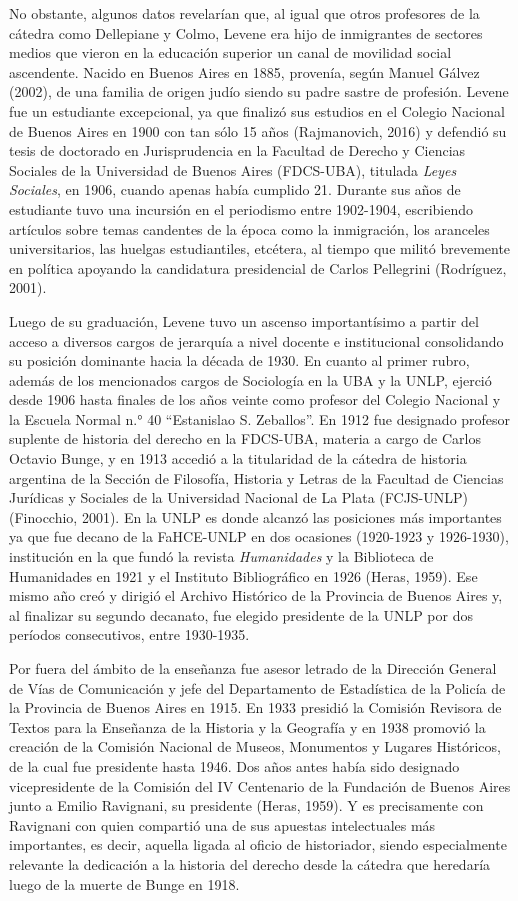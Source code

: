 No obstante, algunos datos revelarían que, al igual que otros profesores de la cátedra como Dellepiane y Colmo, Levene era hijo de inmigrantes de sectores medios que vieron en la educación superior un canal de movilidad social ascendente. Nacido en Buenos Aires en 1885, provenía, según Manuel Gálvez (2002), de una familia de origen judío siendo su padre sastre de profesión. Levene fue un estudiante excepcional, ya que finalizó sus estudios en el Colegio Nacional de Buenos Aires en 1900 con tan sólo 15 años (Rajmanovich, 2016) y defendió su tesis de doctorado en Jurisprudencia en la Facultad de Derecho y Ciencias Sociales de la Universidad de Buenos Aires (FDCS-UBA), titulada \emph{Leyes Sociales}, en 1906, cuando apenas había cumplido 21. Durante sus años de estudiante tuvo una incursión en el periodismo entre 1902-1904, escribiendo artículos sobre temas candentes de la época como la inmigración, los aranceles universitarios, las huelgas estudiantiles, etcétera, al tiempo que militó brevemente en política apoyando la candidatura presidencial de Carlos Pellegrini (Rodríguez, 2001).

Luego de su graduación, Levene tuvo un ascenso importantísimo a partir del acceso a diversos cargos de jerarquía a nivel docente e institucional consolidando su posición dominante hacia la década de 1930. En cuanto al primer rubro, además de los mencionados cargos de Sociología en la UBA y la UNLP, ejerció desde 1906 hasta finales de los años veinte como profesor del Colegio Nacional y la Escuela Normal n.° 40 ``Estanislao S. Zeballos''. En 1912 fue designado profesor suplente de historia del derecho en la FDCS-UBA, materia a cargo de Carlos Octavio Bunge, y en 1913 accedió a la titularidad de la cátedra de historia argentina de la Sección de Filosofía, Historia y Letras de la Facultad de Ciencias Jurídicas y Sociales de la Universidad Nacional de La Plata (FCJS-UNLP) (Finocchio, 2001). En la UNLP es donde alcanzó las posiciones más importantes ya que fue decano de la FaHCE-UNLP en dos ocasiones (1920-1923 y 1926-1930), institución en la que fundó la revista \emph{Humanidades} y la Biblioteca de Humanidades en 1921 y el Instituto Bibliográfico en 1926 (Heras, 1959). Ese mismo año creó y dirigió el Archivo Histórico de la Provincia de Buenos Aires y, al finalizar su segundo decanato, fue elegido presidente de la UNLP por dos períodos consecutivos, entre 1930-1935.

Por fuera del ámbito de la enseñanza fue asesor letrado de la Dirección General de Vías de Comunicación y jefe del Departamento de Estadística de la Policía de la Provincia de Buenos Aires en 1915. En 1933 presidió la Comisión Revisora de Textos para la Enseñanza de la Historia y la Geografía y en 1938 promovió la creación de la Comisión Nacional de Museos, Monumentos y Lugares Históricos, de la cual fue presidente hasta 1946. Dos años antes había sido designado vicepresidente de la Comisión del IV Centenario de la Fundación de Buenos Aires junto a Emilio Ravignani, su presidente (Heras, 1959). Y es precisamente con Ravignani con quien compartió una de sus apuestas intelectuales más importantes, es decir, aquella ligada al oficio de historiador, siendo especialmente relevante la dedicación a la historia del derecho desde la cátedra que heredaría luego de la muerte de Bunge en 1918.

